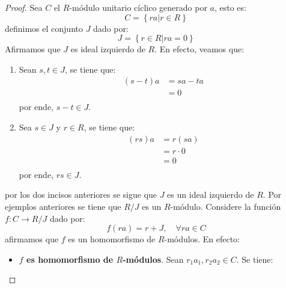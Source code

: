 \documentclass[12pt]{report}
\newcounter{it}
\theoremstyle{largebreak}
\newcommand\cf[3]{\ensuremath{#1:#2\rightarrow#3}}
\begin{document}
    \begin{proof}
        Sea $C$ el $R$-módulo unitario cíclico generado por $a$, esto es:
        \begin{equation*}
            C=\left\{ra\Big|r\in R \right\}
        \end{equation*}
        definimos el conjunto $J$ dado por:
        \begin{equation*}
            J=\left\{r\in R\Big|ra=0 \right\}
        \end{equation*}
        Afirmamos que $J$ es ideal izquierdo de $R$. En efecto, veamos que:
        \begin{enumerate}[label = \textit{(\arabic*)}]
            \item Sean $s,t\in J$, se tiene que:
            \begin{equation*}
                \begin{split}
                    (s-t)a&=sa-ta\\
                    &=0\\
                \end{split}
            \end{equation*}
            por ende, $s-t\in J$.
            \item Sea $s\in J$ y $r\in R$, se tiene que:
            \begin{equation*}
                \begin{split}
                    (rs)a&=r(sa)\\
                    &=r\cdot0\\
                    &=0\\
                \end{split}
            \end{equation*}
            por ende, $rs\in J$.
        \end{enumerate}
        por los dos incisos anteriores se sigue que $J$ es un ideal izquierdo de $R$. Por ejemplos anteriores se tiene que $R/J$ es un $R$-módulo. Considere la función $\cf{f}{C}{R/J}$ dado por:
        \begin{equation*}
            f(ra)=r+J,\quad\forall ra\in C
        \end{equation*}
        afirmamos que $f$ es un homomorfismo de $R$-módulos. En efecto:
        \begin{itemize}
            \item \textbf{$f$ es homomorfismo de $R$-módulos}. Sean $r_1a_1,r_2a_2\in C$. Se tiene:
            \begin{equation*}

\end{equation*}
\end{itemize}
\end{proof}
\end{document}
